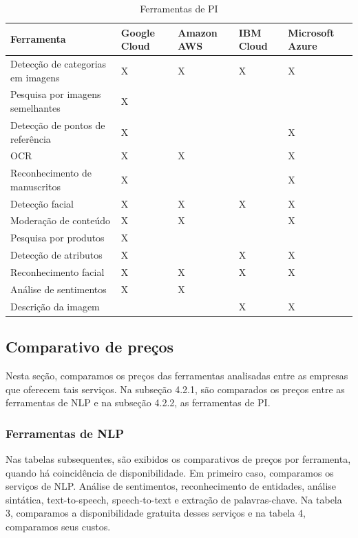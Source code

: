 \documentclass{article}
\begin{document}
\begin{table}[!!ht]
 \caption{Ferramentas de PI}
  \centering
  \begin{tabular}{lllll}
    \cmidrule(r){1-5}
    Ferramenta & Google Cloud & Amazon AWS & IBM Cloud & Microsoft Azure \\
    \midrule
    Detecção de categorias em imagens & X & X & X & X \\
    Pesquisa por imagens semelhantes & X & & & \\
    Detecção de pontos de referência & X & & & X \\
    OCR & X & X & & X \\
    Reconhecimento de manuscritos & X & & & X \\
    Detecção facial & X & X & X & X \\
    Moderação de conteúdo & X & X & & X \\
    Pesquisa por produtos & X & & & \\
    Detecção de atributos & X & & X & X \\
    Reconhecimento facial & X & X & X & X \\
    Análise de sentimentos & X & X & &  \\
    Descrição da imagem & & & X & X \\
    \bottomrule
  \end{tabular}
  \label{tab:table2}
\end{table}

\subsection{Comparativo de preços}

Nesta seção, comparamos os preços das ferramentas analisadas entre as empresas que oferecem tais serviços. Na subseção 4.2.1, são comparados os preços entre as ferramentas de NLP e na subseção 4.2.2, as ferramentas de PI.

\subsubsection{Ferramentas de NLP}

Nas tabelas subsequentes, são exibidos os comparativos de preços por ferramenta, quando há coincidência de disponibilidade. Em primeiro caso, comparamos os serviços de NLP. Análise de sentimentos, reconhecimento de entidades, análise sintática, text-to-speech, speech-to-text e extração de palavras-chave. Na tabela 3, comparamos a disponibilidade gratuita desses serviços e na tabela 4, comparamos seus custos.
\end{document}
